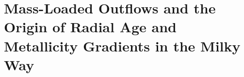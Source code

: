 \documentclass[main.tex]{subfiles}
\begin{document}
\chapter{Mass-Loaded Outflows and the Origin of Radial Age and Metallicity
Gradients in the Milky Way}
\label{outflows}




\end{document}
